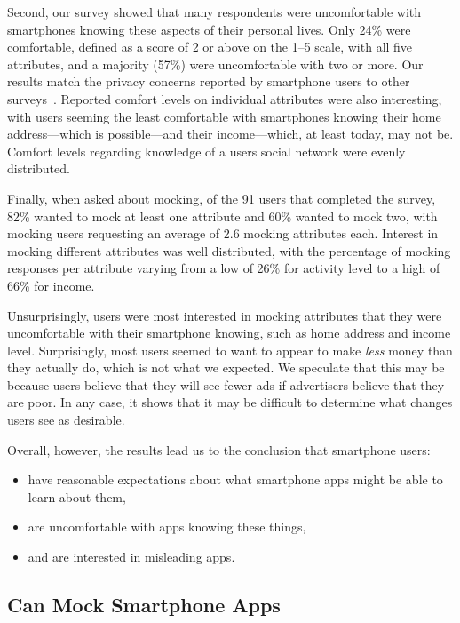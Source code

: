 Second, our survey showed that many respondents were uncomfortable with
smartphones knowing these aspects of their personal lives. Only 24\% were
comfortable, defined as a score of 2 or above on the 1--5 scale, with all
five attributes, and a majority (57\%) were uncomfortable with two or more.
Our results match the privacy concerns reported by smartphone users to other
surveys~\cite{truste-privacy}. Reported comfort levels on individual
attributes were also interesting, with users seeming the least comfortable
with smartphones knowing their home address---which is possible---and their
income---which, at least today, may not be. Comfort levels regarding
knowledge of a users social network were evenly distributed.

Finally, when asked about mocking, of the 91 users that completed the survey,
82\% wanted to mock at least one attribute and 60\% wanted to mock two, with
mocking users requesting an average of 2.6 mocking attributes each. Interest
in mocking different attributes was well distributed, with the percentage of
mocking responses per attribute varying from a low of 26\% for activity level
to a high of 66\% for income.

Unsurprisingly, users were most interested in mocking attributes that they
were uncomfortable with their smartphone knowing, such as home address and
income level. Surprisingly, most users seemed to want to appear to make
\textit{less} money than they actually do, which is not what we expected. We
speculate that this may be because users believe that they will see fewer ads
if advertisers believe that they are poor. In any case, it shows that it may
be difficult to determine what changes users see as desirable.

Overall, however, the results lead us to the conclusion that smartphone
users:
\begin{itemize}

\item have reasonable expectations about what smartphone apps might be able to
learn about them,
\item are uncomfortable with apps knowing these things,
\item and are interested in misleading apps.

\end{itemize}

\subsection{\PocketMocker{} Can Mock Smartphone Apps}
\label{subsec-mockingapps}

